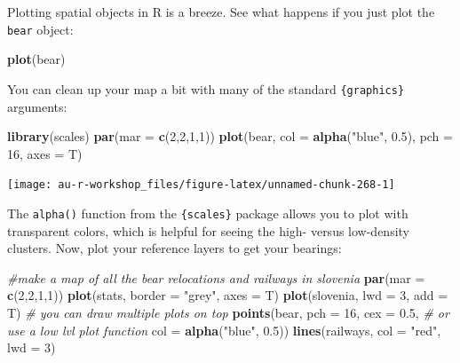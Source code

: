 \documentclass[]{book}
\newenvironment{Shaded}{\begin{snugshade}}{\end{snugshade}}
\newcommand{\KeywordTok}[1]{\textcolor[rgb]{0.13,0.29,0.53}{\textbf{#1}}}
\newcommand{\DataTypeTok}[1]{\textcolor[rgb]{0.13,0.29,0.53}{#1}}
\newcommand{\DecValTok}[1]{\textcolor[rgb]{0.00,0.00,0.81}{#1}}
\newcommand{\FloatTok}[1]{\textcolor[rgb]{0.00,0.00,0.81}{#1}}
\newcommand{\StringTok}[1]{\textcolor[rgb]{0.31,0.60,0.02}{#1}}
\newcommand{\CommentTok}[1]{\textcolor[rgb]{0.56,0.35,0.01}{\textit{#1}}}
\newcommand{\NormalTok}[1]{#1}
\theoremstyle{definition}
\theoremstyle{definition}
\theoremstyle{definition}
\theoremstyle{remark}
\begin{document}
Plotting spatial objects in R is a breeze. See what happens if you just
plot the \texttt{bear} object:

\begin{Shaded}
\begin{Highlighting}[]
\KeywordTok{plot}\NormalTok{(bear)}
\end{Highlighting}
\end{Shaded}

You can clean up your map a bit with many of the standard
\texttt{\{graphics\}} arguments:

\begin{Shaded}
\begin{Highlighting}[]
\KeywordTok{library}\NormalTok{(scales)}
\KeywordTok{par}\NormalTok{(}\DataTypeTok{mar =} \KeywordTok{c}\NormalTok{(}\DecValTok{2}\NormalTok{,}\DecValTok{2}\NormalTok{,}\DecValTok{1}\NormalTok{,}\DecValTok{1}\NormalTok{))}
\KeywordTok{plot}\NormalTok{(bear, }\DataTypeTok{col =} \KeywordTok{alpha}\NormalTok{(}\StringTok{"blue"}\NormalTok{, }\FloatTok{0.5}\NormalTok{), }\DataTypeTok{pch =} \DecValTok{16}\NormalTok{, }\DataTypeTok{axes =}\NormalTok{ T)}
\end{Highlighting}
\end{Shaded}

\begin{center}\texttt{[image: au-r-workshop\_files/figure-latex/unnamed-chunk-268-1]} \end{center}

The \texttt{alpha()} function from the \texttt{\{scales\}} package
\citep{R-scales} allows you to plot with transparent colors, which is
helpful for seeing the high- versus low-density clusters. Now, plot your
reference layers to get your bearings:

\begin{Shaded}
\begin{Highlighting}[]
\CommentTok{#make a map of all the bear relocations and railways in slovenia}
\KeywordTok{par}\NormalTok{(}\DataTypeTok{mar =} \KeywordTok{c}\NormalTok{(}\DecValTok{2}\NormalTok{,}\DecValTok{2}\NormalTok{,}\DecValTok{1}\NormalTok{,}\DecValTok{1}\NormalTok{))}
\KeywordTok{plot}\NormalTok{(stats, }\DataTypeTok{border =} \StringTok{"grey"}\NormalTok{, }\DataTypeTok{axes =}\NormalTok{ T)}
\KeywordTok{plot}\NormalTok{(slovenia, }\DataTypeTok{lwd =} \DecValTok{3}\NormalTok{, }\DataTypeTok{add =}\NormalTok{ T)     }\CommentTok{# you can draw multiple plots on top}
\KeywordTok{points}\NormalTok{(bear, }\DataTypeTok{pch =} \DecValTok{16}\NormalTok{, }\DataTypeTok{cex =} \FloatTok{0.5}\NormalTok{,    }\CommentTok{# or use a low lvl plot function}
       \DataTypeTok{col =} \KeywordTok{alpha}\NormalTok{(}\StringTok{"blue"}\NormalTok{, }\FloatTok{0.5}\NormalTok{))}
\KeywordTok{lines}\NormalTok{(railways, }\DataTypeTok{col =} \StringTok{"red"}\NormalTok{, }\DataTypeTok{lwd =} \DecValTok{3}\NormalTok{) }
\end{Highlighting}
\end{Shaded}
\end{document}
